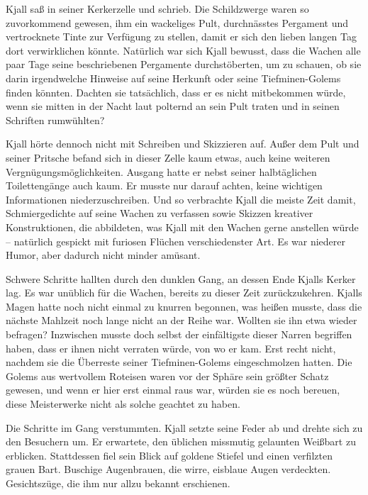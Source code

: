 Kjall saß in seiner Kerkerzelle und schrieb. Die Schildzwerge waren so zuvorkommend gewesen, ihm ein wackeliges Pult, durchnässtes Pergament und vertrocknete Tinte zur Verfügung zu stellen, damit er sich den lieben langen Tag dort verwirklichen könnte. Natürlich war sich Kjall bewusst, dass die Wachen alle paar Tage seine beschriebenen Pergamente durchstöberten, um zu schauen, ob sie darin irgendwelche Hinweise auf seine Herkunft oder seine Tiefminen-Golems finden könnten. Dachten sie tatsächlich, dass er es nicht mitbekommen würde, wenn sie mitten in der Nacht laut polternd an sein Pult traten und in seinen Schriften rumwühlten?

Kjall hörte dennoch nicht mit Schreiben und Skizzieren auf. Außer dem Pult und seiner Pritsche befand sich in dieser Zelle kaum etwas, auch keine weiteren Vergnügungsmöglichkeiten. Ausgang hatte er nebst seiner halbtäglichen Toilettengänge auch kaum. Er musste nur darauf achten, keine wichtigen Informationen niederzuschreiben. Und so verbrachte Kjall die meiste Zeit damit, Schmiergedichte auf seine Wachen zu verfassen sowie Skizzen kreativer Konstruktionen, die abbildeten, was Kjall mit den Wachen gerne anstellen würde – natürlich gespickt mit furiosen Flüchen verschiedenster Art. Es war niederer Humor, aber dadurch nicht minder amüsant.\bigskip



Schwere Schritte hallten durch den dunklen Gang, an dessen Ende Kjalls Kerker lag. Es war unüblich für die Wachen, bereits zu dieser Zeit zurückzukehren. Kjalls Magen hatte noch nicht einmal zu knurren begonnen, was heißen musste, dass die nächste Mahlzeit noch lange nicht an der Reihe war. Wollten sie ihn etwa wieder befragen? Inzwischen musste doch selbst der einfältigste dieser Narren begriffen haben, dass er ihnen nicht verraten würde, von wo er kam. Erst recht nicht, nachdem sie die Überreste seiner Tiefminen-Golems eingeschmolzen hatten. Die Golems aus wertvollem Roteisen waren vor der Sphäre sein größter Schatz gewesen, und wenn er hier erst einmal raus war, würden sie es noch bereuen, diese Meisterwerke nicht als solche geachtet zu haben.

Die Schritte im Gang verstummten. Kjall setzte seine Feder ab und drehte sich zu den Besuchern um. Er erwartete, den üblichen missmutig gelaunten Weißbart zu erblicken. Stattdessen fiel sein Blick auf goldene Stiefel und einen verfilzten grauen Bart. Buschige Augenbrauen, die wirre, eisblaue Augen verdeckten. Gesichtszüge, die ihm nur allzu bekannt erschienen.

